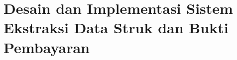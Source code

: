 \chapter{Desain dan Implementasi Sistem Ekstraksi Data Struk dan Bukti Pembayaran}
\label{chapter:desain-implementasi}





